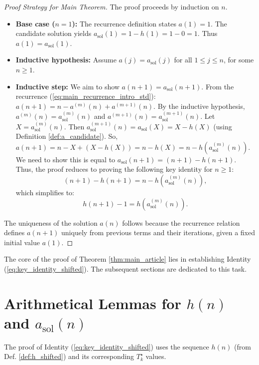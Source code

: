 \documentclass[11pt,a4paper]{article} %
\theoremstyle{remark}
\begin{document}
\begin{proof}[Proof Strategy for Main Theorem]
The proof proceeds by induction on $n$.
\begin{itemize}
    \item \textbf{Base case ($n=1$):} The recurrence definition states $a(1)=1$. The candidate solution yields $a_{\text{sol}}(1) = 1-h(1) = 1-0=1$. Thus $a(1)=a_{\text{sol}}(1)$.
    \item \textbf{Inductive hypothesis:} Assume $a(j)=a_{\text{sol}}(j)$ for all $1 \le j \le n$, for some $n \ge 1$.
    \item \textbf{Inductive step:} We aim to show $a(n+1)=a_{\text{sol}}(n+1)$.
    From the recurrence (\ref{eq:main_recurrence_intro_std}): $a(n+1) = n - a^{(m)}(n) + a^{(m+1)}(n)$.
    By the inductive hypothesis, $a^{(m)}(n) = a_{\text{sol}}^{(m)}(n)$ and $a^{(m+1)}(n) = a_{\text{sol}}^{(m+1)}(n)$.
    Let $X = a_{\text{sol}}^{(m)}(n)$. Then $a_{\text{sol}}^{(m+1)}(n) = a_{\text{sol}}(X) = X - h(X)$ (using Definition \ref{def:a_candidate}).
    So, $a(n+1) = n - X + (X - h(X)) = n - h(X) = n - h(a_{\text{sol}}^{(m)}(n))$.
    We need to show this is equal to $a_{\text{sol}}(n+1) = (n+1) - h(n+1)$.
    Thus, the proof reduces to proving the following key identity for $n \ge 1$:
    \begin{equation} \label{eq:key_identity_shifted_prep}
    (n+1) - h(n+1) = n - h(a_{\text{sol}}^{(m)}(n)),
    \end{equation}
    which simplifies to:
    \begin{equation} \label{eq:key_identity_shifted}
    h(n+1) - 1 = h(a_{\text{sol}}^{(m)}(n)).
    \end{equation}
\end{itemize}
The uniqueness of the solution $a(n)$ follows because the recurrence relation defines $a(n+1)$ uniquely from previous terms and their iterations, given a fixed initial value $a(1)$.
\end{proof}

The core of the proof of Theorem \ref{thm:main_article} lies in establishing Identity (\ref{eq:key_identity_shifted}). The subsequent sections are dedicated to this task.

\section{Arithmetical Lemmas for $h(n)$ and $a_{\text{sol}}(n)$} \label{sec:arithmetical_lemmas}
The proof of Identity (\ref{eq:key_identity_shifted}) uses the sequence $h(n)$ (from Def. \ref{def:h_shifted}) and its corresponding $T^{\star}_k$ values.
\end{document}
